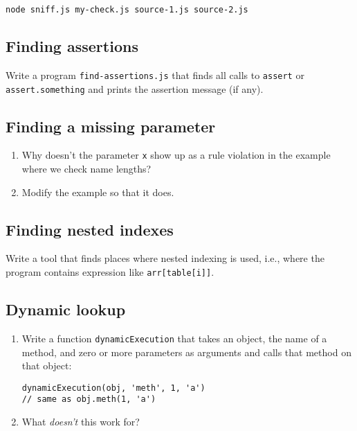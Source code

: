\documentclass[krantzl]{krantz}
\begin{document}
\begin{lstlisting}[frame=single,frameround=tttt]
node sniff.js my-check.js source-1.js source-2.js
\end{lstlisting}


\subsection*{Finding assertions}


Write a program \texttt{find-assertions.js} that finds all calls to \texttt{assert} or \texttt{assert.something}
and prints the assertion message (if any).

\subsection*{Finding a missing parameter}

\begin{enumerate}

\item 

Why doesn't the parameter \texttt{x} show up as a rule violation
    in the example where we check name lengths?



\item 

Modify the example so that it does.



\end{enumerate}

\subsection*{Finding nested indexes}


Write a tool that finds places where nested indexing is used,
i.e.,
where the program contains expression like \texttt{arr[table[i]]}.

\subsection*{Dynamic lookup}

\begin{enumerate}

\item 

Write a function \texttt{dynamicExecution} that takes an object,
    the name of a method,
    and zero or more parameters as arguments
    and calls that method on that object:

\begin{lstlisting}[frame=single,frameround=tttt]
dynamicExecution(obj, 'meth', 1, 'a')
// same as obj.meth(1, 'a')
\end{lstlisting}



\item 

What \emph{doesn't} this work for?



\end{enumerate}
\end{document}
